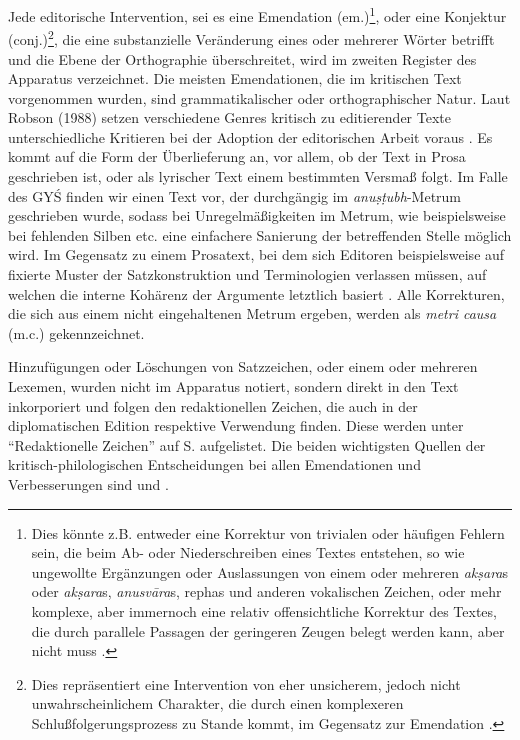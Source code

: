 \documentclass[a4paper,12pt]{article}
\begin{document}
{Jede editorische Intervention, sei es eine Emendation (em.)\footnote{Dies könnte z.B. entweder eine Korrektur von trivialen oder häufigen Fehlern sein, die beim Ab- oder Niederschreiben eines Textes entstehen, so wie ungewollte Ergänzungen oder Auslassungen von einem oder mehreren \textit{akṣara}s oder \textit{akṣara}s, \textit{anusvāra}s, rephas und anderen vokalischen Zeichen, oder mehr komplexe, aber immernoch eine relativ offensichtliche Korrektur des Textes, die durch parallele Passagen der geringeren Zeugen belegt werden kann, aber nicht muss \parencite[95]{acri2011dharma}.}, oder eine Konjektur (conj.)\footnote{Dies repräsentiert eine Intervention von eher unsicherem, jedoch nicht unwahrscheinlichem Charakter, die durch einen komplexeren Schlußfolgerungsprozess zu Stande kommt, im Gegensatz zur Emendation \parencite[95]{acri2011dharma}.}, die eine substanzielle Veränderung eines oder mehrerer Wörter betrifft und die Ebene der Orthographie überschreitet, wird im zweiten Register des Apparatus verzeichnet. Die meisten Emendationen, die im kritischen Text vorgenommen wurden, sind grammatikalischer oder orthographischer Natur. Laut Robson (1988) setzen verschiedene Genres kritisch zu editierender Texte unterschiedliche Kritieren bei der Adoption der editorischen Arbeit voraus \parencite[25]{robson1988}. Es kommt auf die Form der Überlieferung an, vor allem, ob der Text in Prosa geschrieben ist, oder als lyrischer Text einem bestimmten Versmaß folgt. Im Falle des GYŚ finden wir einen Text vor, der durchgängig im \textit{anuṣṭubh}-Metrum geschrieben wurde, sodass bei Unregelmäßigkeiten im Metrum, wie beispielsweise bei fehlenden Silben etc. eine einfachere Sanierung der betreffenden Stelle möglich wird. Im Gegensatz zu einem Prosatext, bei dem sich Editoren beispielsweise auf fixierte Muster der Satzkonstruktion und Terminologien verlassen müssen, auf welchen die interne Kohärenz der Argumente letztlich basiert \parencite[90]{acri2011dharma}. Alle Korrekturen, die sich aus einem nicht eingehaltenen Metrum ergeben, werden als \textit{metri causa} (m.c.) gekennzeichnet.    

Hinzufügungen oder Löschungen von Satzzeichen, oder einem oder mehreren Lexemen, wurden nicht im Apparatus notiert, sondern direkt in den Text inkorporiert und folgen den redaktionellen Zeichen, die auch in der diplomatischen Edition respektive Verwendung finden. Diese werden unter ``Redaktionelle Zeichen'' auf S.\pageref{redz} aufgelistet. Die beiden wichtigsten Quellen der kritisch-philologischen Entscheidungen bei allen Emendationen und Verbesserungen sind \parencite{maas1950} und \parencite{katre1954}. 

}
\end{document}
